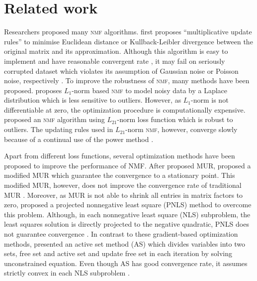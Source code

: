 \section{Related work}
Researchers proposed many \textsc{nmf} algorithms. \citet{lee2001algorithms} first proposes ``multiplicative update rules'' to minimise Euclidean distance or Kullback-Leibler divergence between the original matrix and its approximation. Although this algorithm is easy to implement and have reasonable convergent rate \citep{lee2001algorithms}, it may fail on seriously corrupted dataset which violates its assumption of Gaussian noise or Poisson noise, respectively \citep{guan2017truncated}.  To improve the robustness of \textsc{nmf}, many methods have been proposed. \citet{lam2008non} proposes ${L_1}$-norm based \textsc{nmf} to model noisy data by a Laplace distribution which is less sensitive to outliers. However, as $L_1$-norm is not differentiable at zero, the optimization procedure is computationally expensive. \citet{kong2011robust} proposed an \textsc{nmf} algorithm using $L_{21}$-norm loss function which is robust to outliers. The updating rules used in $L_{21}$-norm \textsc{nmf}, however, converge slowly because of a continual use of the power method \citep{guan2017truncated}.

Apart from different loss functions, several optimization methods have been proposed to improve the performance of NMF. After \citet{lee2001algorithms} proposed MUR, \citet{ lin2007convergence} proposed a modified MUR which guarantee the convergence to a stationary point. This modified MUR, however, does not improve the convergence rate of traditional MUR \citet{guan2012nenmf}. Moreover, as MUR is not able to shrink all entries in matrix factors to zero, \citet{berry2007algorithms} proposed a projected nonnegative least square (PNLS) method to overcome this problem. Although, in each nonnegative least square (NLS) subproblem, the least squares solution is directly projected to the negative quadratic, PNLS does not guarantee convergence \citet{guan2012nenmf}. In contrast to these gradient-based optimization methods, \citet{kim2008nonnegative} presented an active set method (AS) which divides variables into two sets, free set and active set and update free set in each iteration by solving unconstrained equation. Even though AS has good convergence rate, it assumes strictly convex in each NLS subproblem \citet{kim2008nonnegative}. 
